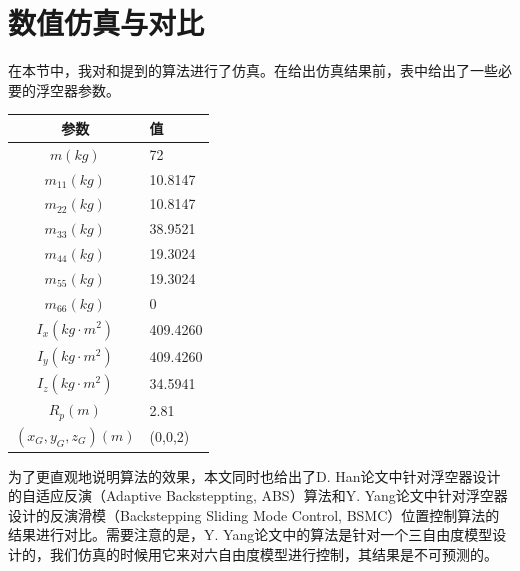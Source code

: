 \section{数值仿真与对比}
在本节中，我对和提到的算法进行了仿真。在给出仿真结果前，表中给出了一些必要的浮空器参数。

\begin{table}[!htp]
  \centering
  \vspace{0.5em}
  \begin{tabular}{cl}
    \toprule
    参数&值\\
    \midrule
    $m(kg)$&72\\
    $m_{11}(kg)$&10.8147\\
    $m_{22}(kg)$&10.8147\\
    $m_{33}(kg)$&38.9521\\
    $m_{44}(kg)$&19.3024\\
    $m_{55}(kg)$&19.3024\\
    $m_{66}(kg)$&0\\
    $I_x(kg\cdot m^2)$&409.4260\\
    $I_y(kg\cdot m^2)$&409.4260\\
    $I_z(kg\cdot m^2)$&34.5941\\
    $R_p(m)$&2.81\\
    $(x_G,y_G,z_G)(m)$&(0,0,2)\\
    \bottomrule
  \end{tabular}
\end{table}

为了更直观地说明算法的效果，本文同时也给出了D. Han论文中针对浮空器设计的自适应反演（Adaptive Backsteppting, ABS）算法\cite{han2015adaptive}和Y. Yang论文中\cite{Yang2016Positioning}针对浮空器设计的反演滑模（Backstepping Sliding Mode Control, BSMC）位置控制算法的结果进行对比。需要注意的是，Y. Yang论文中的算法是针对一个三自由度模型设计的，我们仿真的时候用它来对六自由度模型进行控制，其结果是不可预测的。

